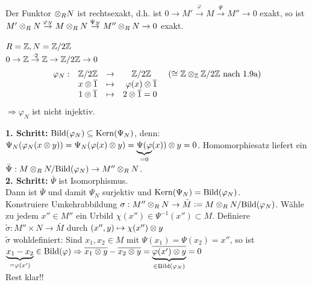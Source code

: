 \documentclass[a4paper, 10pt]{report}
\begin{document}
\begin{Prop}
\label{1.12}
  Der Funktor $\ten[R] N$ ist rechtsexakt, d.h. ist $0 \to M'
  \overset{\varphi}{\to} M \overset{\Psi}{\to} M'' \to 0$ exakt, so ist $ M'
  \ten[R] N \overset{\varphi_N}{\to} M \ten[R] N \overset{\Psi_N}{\to} M'' \ten[R] N
  \to 0$ exakt.
\end{Prop}

\begin{nnBsp} 
  $R = \mathbb{Z}, N = \mathbb{Z}/2 \mathbb{Z}$\\
  $0 \to \mathbb{Z} \overset{ \cdot 2}{\to} \mathbb{Z} \to \mathbb{Z}/2
  \mathbb{Z} \to 0$
  \[
  \begin{matrix}
  \varphi_N:& \ZZ/2 \ZZ &\to& \ZZ / 2 \ZZ &(\cong \ZZ \ten[\ZZ] \ZZ / 2 \ZZ
  \text{ nach 1.9a})\\
  &x\ten\overline 1 & \mapsto & \varphi(x)\ten\overline 1&\\
  &1\ten\overline 1&\mapsto&2\ten\overline 1=0\
  \end{matrix}
  \]
  $\Rightarrow \varphi_N$ ist nicht injektiv.
\end{nnBsp}

\begin{Bew} 
  \textbf{1. Schritt:} $\mathrm{Bild}(\varphi_N) \subseteq \mathrm{Kern}(\Psi_N)$,
  denn: $\Psi_N(\varphi_N(x \ten y)) = \Psi_N(\varphi(x) \ten y) =
  \underset{=0}{\underbrace{\Psi(\varphi}}(x)) \ten y = 0$. Homomorphiesatz
  liefert ein $\bar{\Psi}: M \ten[R] N/\B{\varphi_N} \to M'' \ten[R]
  N$.\\
  \textbf{2. Schritt:} $\bar{\Psi}$ ist Isomorphismus.\\
  Dann ist $\bar{\Psi}$ und damit $\Psi_N$ surjektiv und $\mathrm{Kern}(\Psi_N) =
  \mathrm{Bild}(\varphi_N)$.\\
  Konstruiere Umkehrabbildung $\sigma: M'' \ten[R] N \to \bar{M} \defeqr M
  \ten[R] N/\B{\varphi_N}$. Wähle zu jedem $x'' \in M''$ ein Urbild
  $\chi(x'') \in \Psi^{-1}(x'') \subset M$.
  Definiere $\tilde{\sigma}: M'' \times N \to \bar{M}$ durch $(x'', y) \mapsto
  \chi(x'') \ten y$\\
  $\tilde{\sigma}$ wohldefiniert:
  Sind $x_1,x_2 \in M$ mit $\Psi(x_1) = \Psi(x_2) = x''$, so ist $\underset{= \varphi(x')
  }{\underbrace{x_1 - x_2}} \in \B{\varphi} \Rightarrow \overline{x_1
  \ten y} - \overline{x_2 \ten y} = \underset{\in \B{\varphi_N}
  }{\underbrace{\overline{\varphi(x') \ten y}}} = 0$\\
  Rest klar!!
\end{Bew}

\end{document}
